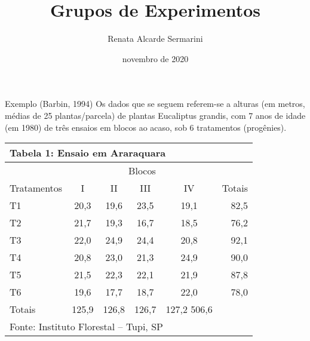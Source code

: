 \documentclass[
  ignorenonframetext,
]{beamer}
\title{Grupos de Experimentos}
\author{Renata Alcarde Sermarini}
\date{novembro de 2020}
\begin{document}
\frame{\titlepage}

\begin{frame}{Exemplo (Barbin, 1994)}
\protect\hypertarget{exemplo-barbin-1994}{}
Os dados que se seguem referem-se a alturas (em metros, médias de 25
plantas/parcela) de plantas Eucaliptus grandis, com 7 anos de idade (em
1980) de três ensaios em blocos ao acaso, sob 6 tratamentos (progênies).

\begin{center}
\begin{tabular}{lccccr} 
\multicolumn{6}{l}{Tabela 1: Ensaio em Araraquara}\\ \hline
 & \multicolumn{4}{c}{Blocos} & \\ \cline{2-5}
Tratamentos &   I & II &    III &   IV  & Totais \\ \hline
T1 &    20,3 &  19,6 &  23,5 &  19,1 &  82,5\\
T2 &    21,7 &  19,3 &  16,7 &  18,5 &  76,2\\
T3 &    22,0 &  24,9 &  24,4 &  20,8 &  92,1\\
T4 &    20,8 &  23,0 &  21,3 &  24,9 &  90,0\\
T5 &    21,5 &  22,3 &  22,1 &  21,9 &  87,8\\
T6 &    19,6 &  17,7 &  18,7 &  22,0 &  78,0\\ \hline
Totais &    125,9 & 126,8 & 126,7 & 127,2   506,6\\ \hline
\multicolumn{6}{l}{Fonte: Instituto Florestal – Tupi, SP}\\
\end{tabular}
\end{center}
\end{frame}
\end{document}
